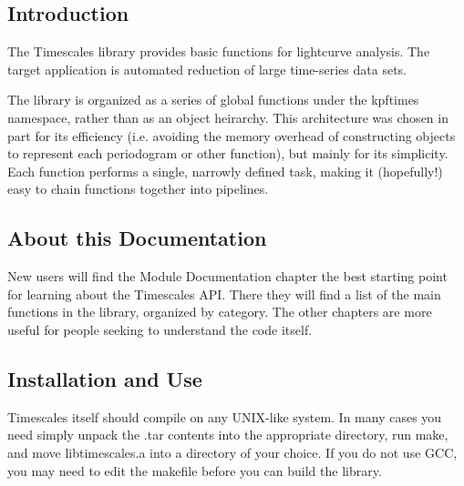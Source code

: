 \hypertarget{index_intro}{}\subsection{Introduction}\label{index_intro}
The Timescales library provides basic functions for lightcurve analysis. The target application is automated reduction of large time-\/series data sets.

The library is organized as a series of global functions under the kpftimes namespace, rather than as an object heirarchy. This architecture was chosen in part for its efficiency (i.e. avoiding the memory overhead of constructing objects to represent each periodogram or other function), but mainly for its simplicity. Each function performs a single, narrowly defined task, making it (hopefully!) easy to chain functions together into pipelines.\hypertarget{index_metahelp}{}\subsection{About this Documentation}\label{index_metahelp}


 
 New users will find the Module Documentation chapter the best 
 starting point for learning about the Timescales API. There they will find 
 a list of the main functions in the library, organized by category. The 
 other chapters are more useful for people seeking to understand the code 
 itself.
 \hypertarget{index_install}{}\subsection{Installation and Use}\label{index_install}
Timescales itself should compile on any UNIX-\/like system. In many cases you need simply unpack the .tar contents into the appropriate directory, run {\ttfamily make}, and move libtimescales.a into a directory of your choice. If you do not use GCC, you may need to edit the makefile before you can build the library.

